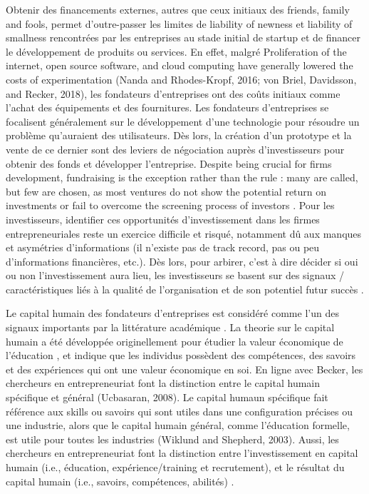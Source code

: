 \documentclass[12pt]{article}
\begin{document}
Obtenir des financements externes, autres que ceux initiaux des friends, family and fools, permet d'outre-passer les limites de liability of newness et liability of smallness rencontrées par les entreprises au stade initial de startup et de financer le développement de produits ou services. En effet, malgré Proliferation of the internet, open source software, and cloud computing have generally lowered the costs of experimentation (Nanda and Rhodes-Kropf, 2016; von Briel, Davidsson, and Recker, 2018), les fondateurs d'entreprises ont des coûts initiaux comme l'achat des équipements et des fournitures. Les fondateurs d'entreprises se focalisent généralement sur le développement d'une technologie pour résoudre un problème qu'auraient des utilisateurs. Dès lors, la création d'un prototype et la vente de ce dernier sont des leviers de négociation auprès d'investisseurs pour obtenir des fonds et développer l'entreprise. Despite being crucial for firms development, fundraising is the exception rather than the rule : many are called, but few are chosen, as most ventures do not show the potential return on investments or fail to overcome the screening process of investors \citep{huang2017growing}. Pour les investisseurs, identifier ces opportunités d'investissement dans les firmes entrepreneuriales reste un exercice difficile et risqué, notamment dû aux manques et asymétries d'informations (il n'existe pas de track record, pas ou peu d'informations financières, etc.). Dès lors, pour arbirer, c'est à dire décider si oui ou non l'investissement aura lieu, les investisseurs se basent sur des signaux / caractéristiques liés à la qualité de l'organisation et de son potentiel futur succès \citep{plummer2016better}.

Le capital humain des fondateurs d'entreprises est considéré comme l'un des signaux importants par la littérature académique \citet{pinelli2020too, ko2018signaling}. La theorie sur le capital humain a été développée originellement pour étudier la valeur économique de l'éducation \citep{becker1964human}, et indique que les individus possèdent des compétences, des savoirs et des expériences qui ont une valeur économique en soi. En ligne avec Becker, les chercheurs en entrepreneuriat font la distinction entre le capital humain spécifique et général (Ucbasaran, 2008). Le capital humaun spécifique fait référence aux skills ou savoirs qui sont utiles dans une configuration précises ou une industrie, alors que le capital humain général, comme l'éducation formelle, est utile pour toutes les industries (Wiklund and Shepherd, 2003). Aussi, les chercheurs en entrepreneuriat font la distinction entre l'investissement en capital humain (i.e., éducation, expérience/training et recrutement), et le résultat du capital humain (i.e., savoirs, compétences, abilités) \citep{marvel2016human}.
\end{document}
